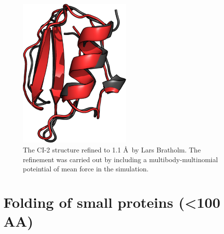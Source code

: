 \begin{figure}%
    \centering
    \includegraphics[width=0.5\textwidth]{figures/ci2_pymol/ci2_lars.pdf}
    \caption{The CI-2 structure refined to 1.1 \AA~by Lars Bratholm. The refinement was carried out by including a multibody-multinomial poteintial of mean force in the simulation.}
    \label{fig:ci2_lars}%
\end{figure}

\clearpage
\section{Folding of small proteins (\textless 100 AA)}

